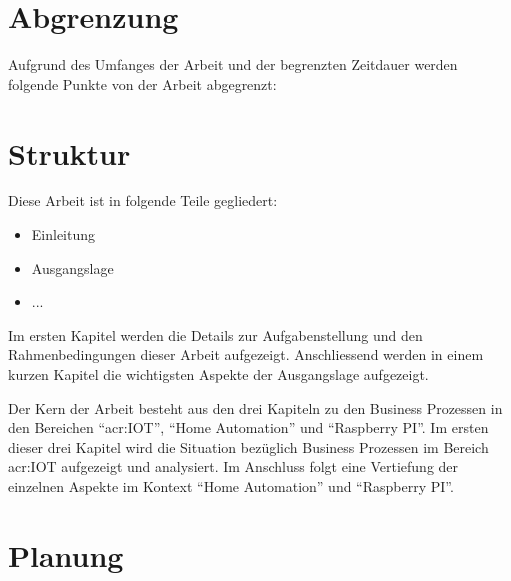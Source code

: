 \section{Abgrenzung} \label{sec:Abgrenzung}
Aufgrund des Umfanges der Arbeit und der begrenzten Zeitdauer werden folgende Punkte von der Arbeit abgegrenzt:

\begin{itemize}
\end{itemize}


\section{Struktur}
Diese Arbeit ist in folgende Teile gegliedert:

\begin{itemize}
\item Einleitung
\item Ausgangslage
\item ...
\end{itemize}

Im ersten Kapitel werden die Details zur Aufgabenstellung und den Rahmenbedingungen dieser Arbeit aufgezeigt. Anschliessend werden in einem kurzen Kapitel die wichtigsten Aspekte der Ausgangslage aufgezeigt.

Der Kern der Arbeit besteht aus den drei Kapiteln zu den Business Prozessen in den Bereichen "`\gls{acr:IOT}"', "`Home Automation"' und "`Raspberry PI"'. Im ersten dieser drei Kapitel wird die Situation bezüglich Business Prozessen im Bereich \gls{acr:IOT} aufgezeigt und analysiert. Im Anschluss folgt eine Vertiefung der einzelnen Aspekte im Kontext "`Home Automation"' und "`Raspberry PI"'.


\section{Planung} \label{sec:Intro:Planning}
